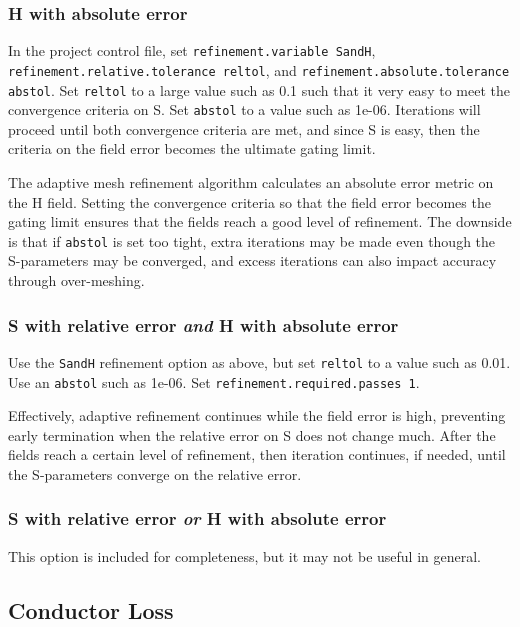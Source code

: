 \documentclass[titlepage]{article}
\renewcommand\_{\textunderscore\linebreak[1]}
\begin{document}
\subsubsection{H with absolute error}

In the project control file, set \texttt{refinement.variable SandH}, \texttt{refinement.relative.tolerance reltol}, and \texttt{refinement.absolute.tolerance abstol}.  Set \texttt{reltol} to a large value such as 0.1 such that it very easy to meet the convergence criteria on S.  Set \texttt{abstol} to a value such as 1e-06.  Iterations will proceed until both convergence criteria are met, and since S is easy, then the criteria on the field error becomes the ultimate gating limit.

The adaptive mesh refinement algorithm calculates an absolute error metric on the H field.  Setting the convergence criteria so that the field error becomes the gating limit ensures that the fields reach a good level of refinement.  The downside is that if \texttt{abstol} is set too tight, extra iterations may be made even though the S-parameters may be converged, and excess iterations can also impact accuracy through over-meshing.

\subsubsection{S with relative error \textit{and} H with absolute error}

Use the \texttt{SandH} refinement option as above, but set \texttt{reltol} to a value such as 0.01.  Use an \texttt{abstol} such as 1e-06.  Set \texttt{refinement.required.passes 1}.

Effectively, adaptive refinement continues while the field error is high, preventing early termination when the relative error on S does not change much.  After the fields reach a certain level of refinement, then iteration continues, if needed, until the S-parameters converge on the relative error.

\subsubsection{S with relative error \textit{or} H with absolute error}

This option is included for completeness, but it may not be useful in general.

\subsection{Conductor Loss}
\end{document}

